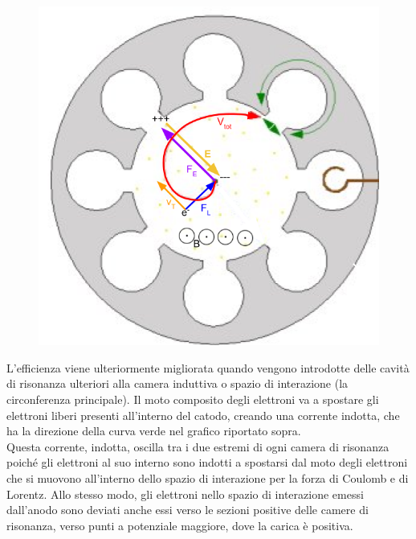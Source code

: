 \documentclass{article}
\begin{document}
{\begin{figure}[h]
\centering
\includegraphics[scale=0.25]{5.png}
\label{fig: cubed graph}
\end{figure}
L'efficienza viene ulteriormente migliorata quando vengono introdotte delle cavità di risonanza ulteriori alla camera induttiva o spazio di interazione (la circonferenza principale). Il moto composito degli elettroni va a spostare gli elettroni liberi presenti all'interno del catodo, creando una corrente indotta, che ha la direzione della curva verde nel grafico riportato sopra. 
\\

Questa corrente, indotta, oscilla tra i due estremi di ogni camera di risonanza poiché gli elettroni al suo interno sono indotti a spostarsi dal moto degli elettroni che si muovono all'interno dello spazio di interazione per la forza di Coulomb e di Lorentz. Allo stesso modo, gli elettroni nello spazio di interazione emessi dall'anodo sono deviati anche essi verso le sezioni positive delle camere di risonanza, verso punti a potenziale maggiore, dove la carica è positiva. 
\\

}
\end{document}
